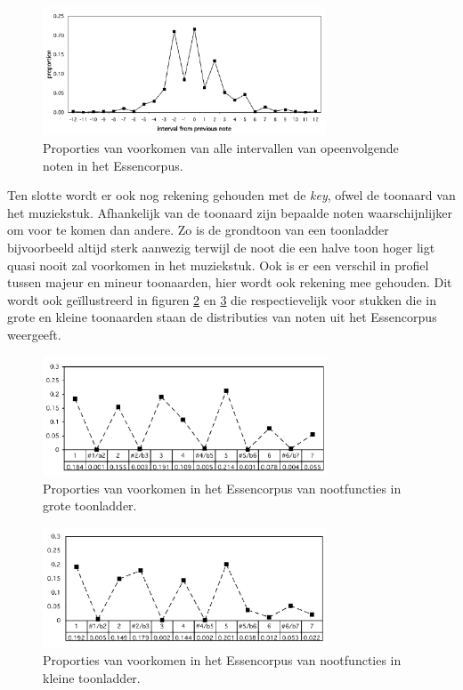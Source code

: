 \begin{figure}[!ht]
  \centering
  \includegraphics[width=0.75\textwidth]{2_Objectieve_Beoordeling/proximity}
  \caption{Proporties van voorkomen van alle intervallen van opeenvolgende noten in het Essencorpus.}
  \label{figuur:proximity}
\end{figure}

Ten slotte wordt er ook nog rekening gehouden met de \textit{key}, ofwel de toonaard van het muziekstuk. Afhankelijk van de toonaard zijn bepaalde noten waarschijnlijker om voor te komen dan andere. Zo is de grondtoon van een toonladder bijvoorbeeld altijd sterk aanwezig terwijl de noot die een halve toon hoger ligt quasi nooit zal voorkomen in het muziekstuk. Ook is er een verschil in profiel tussen majeur en mineur toonaarden, hier wordt ook rekening mee gehouden. Dit wordt ook ge\"illustreerd in figuren \ref{figuur:key_major} en \ref{figuur:key_minor} die respectievelijk voor stukken die in grote en kleine toonaarden staan de distributies van noten uit het Essencorpus weergeeft. 

\begin{figure}[!ht]
  \centering
  \includegraphics[width=0.75\textwidth]{2_Objectieve_Beoordeling/key_major}
  \caption{Proporties van voorkomen in het Essencorpus van nootfuncties in grote toonladder.}
  \label{figuur:key_major}
\end{figure}

\begin{figure}[!ht]
  \centering
  \includegraphics[width=0.75\textwidth]{2_Objectieve_Beoordeling/key_minor}
  \caption{Proporties van voorkomen in het Essencorpus van nootfuncties in kleine toonladder.}
  \label{figuur:key_minor}
\end{figure}

